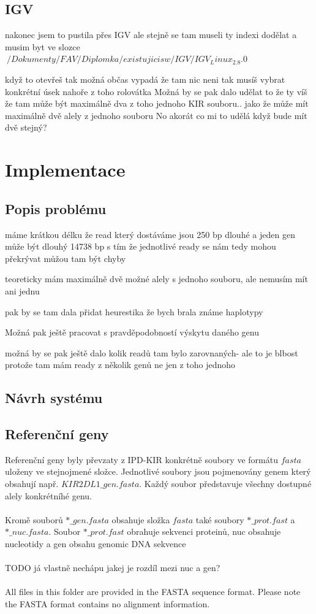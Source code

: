 \documentclass[czech,DP]{thesiskiv}
\numberwithin{equation}{section}
\begin{document}
\section{IGV}
nakonec jsem to pustila přes IGV ale stejně se tam museli ty indexi dodělat
a musim byt ve slozce 
$~/Dokumenty/FAV/Diplomka/existujicisw/IGV/IGV_Linux_2.8.0$

když to otevřeš tak možná občas vypadá že tam nic neni tak musíš vybrat konkrétní úsek nahoře z toho rolovátka
Možná by se pak dalo udělat to že ty víš že tam může být maximálně dva z toho jednoho KIR souboru.. jako že může mít maximálně dvě alely z jednoho souboru
No akorát co mi to udělá když bude mít dvě stejný? 

\chapter{Implementace}
\section{Popis problému}
máme krátkou délku
že read který dostáváme jsou 250 bp dlouhé a jeden gen může být dlouhý 14738 bp
s tím že jednotlivé ready se nám tedy mohou překrývat
můžou tam být chyby

teoreticky mám maximálně dvě možné alely s jednoho souboru, ale nemusím mít ani jednu 

pak by se tam dala přidat heurestika že bych brala známe haplotypy

Možná pak ještě pracovat s pravděpodobností výskytu daného genu

možná by se pak ještě dalo kolik readů tam bylo zarovnaných- ale to je blbost protože tam mám ready z několik genů ne jen z toho jednoho 
\section{Návrh systému}
\section{Referenční geny}
Referenční geny byly převzaty z IPD-KIR \cite{imgt_hla_database} konkrétně soubory ve formátu $fasta$ uloženy ve stejnojmené složce. Jednotlivé soubory jsou pojmenovány genem který obsahují např. $KIR2DL1\_gen.fasta$. Každý soubor představuje všechny dostupné alely konkrétníhé genu.
\\
\\
Kromě souborů $*\_gen.fasta$ obsahuje složka $fasta$ také soubory $*\_prot.fast$ a $*\_nuc.fasta$. Soubor $*\_prot.fast$ obrahuje sekvenci proteinů, nuc obsahuje nucleotidy a gen obsahu genomic DNA sekvence
\\
\\
TODO já vlastně nechápu jakej je rozdíl mezi nuc a gen? 
\\
\\
All files in this folder are provided in the FASTA sequence format. Please note the FASTA format contains no alignment information.
\end{document}
